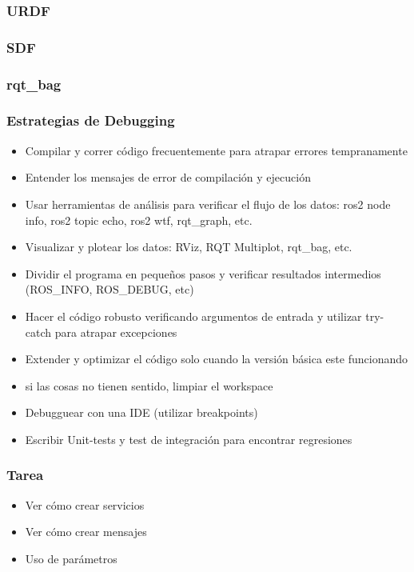 \begin{frame}
    \frametitle{URDF}
   
    
\end{frame}

\begin{frame}
    \frametitle{SDF}
 
    
    
\end{frame}


\begin{frame}
    \frametitle{rqt\_bag}
    

    
\end{frame}

\begin{frame}
    \frametitle{Estrategias de Debugging}
    
    \begin{itemize}
        \item Compilar y correr código frecuentemente para atrapar errores tempranamente
        \item Entender los mensajes de error de compilación y ejecución
        \item Usar herramientas de análisis para verificar el flujo de los datos: ros2 node info, ros2 topic echo, ros2 wtf, rqt\_graph, etc.
        \item Visualizar y plotear los datos: RViz, RQT Multiplot, rqt\_bag, etc.
        \item Dividir el programa en pequeños pasos y verificar resultados intermedios (ROS\_INFO, ROS\_DEBUG, etc)
        \item Hacer el código robusto verificando argumentos de entrada y utilizar try-catch para atrapar excepciones
        \item Extender y optimizar el código solo cuando la versión básica este funcionando
        \item si las cosas no tienen sentido, limpiar el workspace
        \item Debugguear con una IDE (utilizar breakpoints)
        \item Escribir Unit-tests y test de integración para encontrar regresiones
    \end{itemize}
    
\end{frame}

\begin{frame}
	\frametitle{Tarea}
	
	\begin{itemize}
		\item Ver cómo crear servicios
		\item Ver cómo crear mensajes
		\item Uso de parámetros
	\end{itemize}
	
\end{frame}


